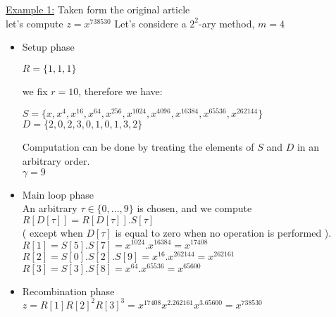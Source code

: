 \begin{itemize}
			\underline{Example 1:} Taken form the original article\\
			let's compute $z=x^{738530}$
			Let's considere a $2^2$-ary method, $m=4$
			\begin{itemize}
				\item Setup phase
				\begin{center}
					$R = \{ 1,1,1 \}$
				\end{center}
				we fix $r=10$, therefore we have:
				\begin{center}
					$S = \{ x,x^4,x^{16},x^{64},x^{256},x^{1024},x^{4096},x^{16384},x^{65536},x^{262144} \}$\\
					$D = \{2,0,2,3,0,1,0,1,3,2\}$
				\end{center}
				Computation can be done by treating the elements of $S$ and $D$ in an arbitrary order.\\
				$\gamma = 9$
				\item Main loop phase\\
				An arbitrary $\tau\in \{0, . . . ,9\}$ is chosen, and we compute $R[D[\tau]] =R[D[\tau]].S[\tau]$\\
				( except when $D[\tau]$ is equal to zero when no operation is performed ).\\	
				$R[1] = S[5].S[7] = x^{1024}.x^{16384} = x^{17408}$\\
				$R[2] = S[0].S[2].S[9] = x^{16}.x^{262144} = x^{262161}$\\
				$R[3] = S[3].S[8] = x^{64}.x^{65536} = x^{65600}$\\
				\item Recombination phase\\
				$z = R[1] R[2]^2 R[3]^3 = x^{17408} x^{2.262161} x^{3.65600} = x^{738530}$
			\end{itemize}

	
\end{itemize}